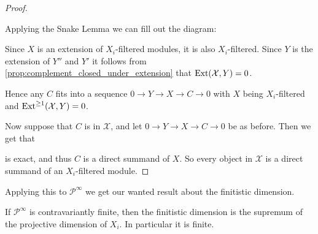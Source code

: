 \begin{theorem}
\begin{proof}
\begin{center}
		\end{center}
		Applying the Snake Lemma we can fill out the diagram:
		\begin{center}
		\end{center}
		Since $X$ is an extension of $X_i$-filtered modules, it is also $X_i$-filtered. Since $Y$ is the extension of $Y''$ and $Y'$ it follows from \cref{prop:complement_closed_under_extension} that $\operatorname{Ext}(\mathcal X, Y)=0$.
		
		Hence any $C$ fits into a sequence $0 \to Y \to X \to C \to 0$ with $X$ being $X_i$-filtered and $\operatorname{Ext}^{\geq 1}(\mathcal X, Y)=0$.
		
		Now suppose that $C$ is in $\mathcal X$, and let $0 \to Y \to X \to C \to 0$ be as before. Then we get that
		\begin{center}
		\end{center}
		is exact, and thus $C$ is a direct summand of $X$. So every object in $\mathcal X$ is a direct summand of an $X_i$-filtered module.
	\end{proof}
\end{theorem}

Applying this to $\mathcal P^\infty$ we get our wanted result about the finitistic dimension.

\begin{cor}\label{cor:contravariant_finite_implies_FDC}
	If $\mathcal P^\infty$ is contravariantly finite, then the finitistic dimension is the supremum of the projective dimension of $X_i$. In particular it is finite.
\end{cor}

